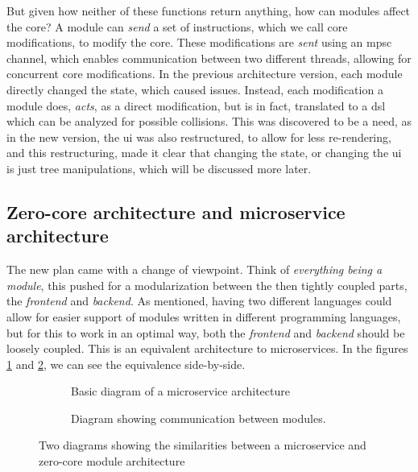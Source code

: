 But given how neither of these functions return anything, how can modules affect
the core? A module can \textit{send} a set of instructions, which we call core
modifications, to modify the core. These modifications are \textit{sent} using
an \gls*{mpsc} channel, which enables communication between two different
threads, allowing for concurrent core modifications. In the previous
architecture version, each module directly changed the state, which caused
issues. Instead, each modification a module does, \textit{acts}, as a direct
modification, but is in fact, translated to a \gls*{dsl} which can be analyzed
for possible collisions. This was discovered to be a need, as in the new
version, the \gls*{ui} was also restructured, to allow for less re-rendering,
and this restructuring, made it clear that changing the state, or changing the
\gls*{ui} is just tree manipulations, which will be discussed more later.


\subsection{Zero-core architecture and microservice architecture}

The new plan came with a change of viewpoint. Think of
\textit{everything being a module}, this pushed for a modularization between the
then tightly coupled parts, the \textit{frontend} and \textit{backend}. As
mentioned, having two different languages could allow for easier support of
modules written in different programming languages, but for this to work in an
optimal way, both the \textit{frontend} and \textit{backend} should be loosely
coupled. This is an equivalent architecture to microservices. In the figures
\ref{sfig:mic} and \ref{sfig:mod}, we can see the equivalence side-by-side.

\begin{figure}[H]
  \begin{subfigure}[h]{0.49\linewidth}
    
    \caption{Basic diagram of a microservice architecture}
    \label{sfig:mic}
  \end{subfigure}
  \hfill
  \begin{subfigure}[h]{0.49\linewidth}
    
    \caption{
      Diagram showing communication between modules.
    }
    \label{sfig:mod}
  \end{subfigure}
  \caption{
    Two diagrams showing the similarities between a microservice and zero-core
    module architecture
  }
  \label{fig:comp}
\end{figure}


